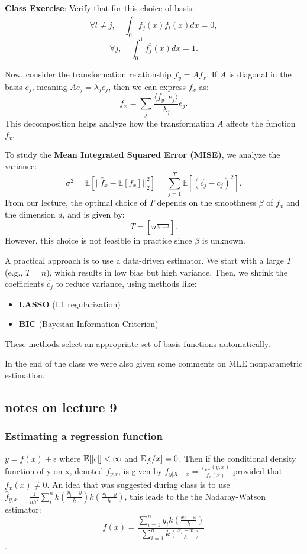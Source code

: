 \documentclass{article}
\begin{document}
\textbf{Class Exercise}: Verify that for this choice of basis:
\[
\forall l \neq j, \quad \int_{0}^{1} f_j(x) f_l(x) dx = 0,
\]
\[
\forall j, \quad \int_{0}^{1} f_j^2(x) dx = 1.
\]

Now, consider the transformation relationship \( f_y = A f_x \). If \( A \) is diagonal in the basis \( e_j \), meaning \( A e_j = \lambda_j e_j \), then we can express \( f_x \) as:
\[
f_x = \sum_j \frac{\langle f_y, e_j \rangle}{\lambda_j} e_j.
\]
This decomposition helps analyze how the transformation \( A \) affects the function \( f_x \).

To study the \textbf{Mean Integrated Squared Error (MISE)}, we analyze the variance:
\[
\sigma^2 = \mathbb{E} \left[ ||\hat{f}_x - \mathbb{E}[f_x]||^2_2 \right] = \sum_{j=1}^{T} \mathbb{E} \left[ (\hat{c_j} - c_j)^2 \right].
\]
From our lecture, the optimal choice of \( T \) depends on the smoothness \( \beta \) of \( f_x \) and the dimension \( d \), and is given by:
\[
T = \left[ n^{\frac{1}{2\beta + d}} \right].
\]
However, this choice is not feasible in practice since \( \beta \) is unknown.

\begin{remark}
    A practical approach is to use a data-driven estimator. We start with a large \( T \) (e.g., \( T = n \)), which results in low bias but high variance. Then, we shrink the coefficients \( \hat{c_j} \) to reduce variance, using methods like:
    \begin{itemize}
        \item \textbf{LASSO} (L1 regularization)
        \item \textbf{BIC} (Bayesian Information Criterion)
    \end{itemize}
    These methods select an appropriate set of basis functions automatically.
\end{remark}



In the end of the class we were also given some comments on MLE nonparametric estimation. 


\subsection{notes on lecture 9}

\subsubsection{Estimating a regression function}
\(y=f(x)+ \epsilon\) where \(\mathbb{E}[|\epsilon|]<\infty\) and \(\mathbb{E}[\epsilon/x]=0\). Then if the conditional density function of y on x, denoted \(f_{y|x}\), is given by \(f_{y|X=x}=\frac{f_{y,x}(y,x)}{f_{x}(x)}\) provided that \(f_{x}(x)\neq 0\). An idea that was suggested during class is to use \(\hat{f}_{y,x}=\frac{1}{nh^{2}}\sum_{i}^{n}k\left(\frac{y_i-y}{h}\right)k\left(\frac{x_i-y}{h}\right)\), this leads to the the Nadaray-Watson estimator: \[f(x)=\frac{\sum_{i=1}^{n}y_{i}k\left(\frac{x_i-x}{h}\right)}{\sum_{i=1}^{n}k\left(\frac{x_i-x}{h}\right)}\]. \\
\end{document}
